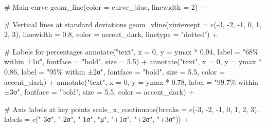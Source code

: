 \documentclass[
  letterpaper,
  DIV=11,
  numbers=noendperiod]{scrreprt}
\newenvironment{Shaded}{\begin{snugshade}}{\end{snugshade}}
\newcommand{\AttributeTok}[1]{\textcolor[rgb]{0.40,0.45,0.13}{#1}}
\newcommand{\CommentTok}[1]{\textcolor[rgb]{0.37,0.37,0.37}{#1}}
\newcommand{\DecValTok}[1]{\textcolor[rgb]{0.68,0.00,0.00}{#1}}
\newcommand{\FloatTok}[1]{\textcolor[rgb]{0.68,0.00,0.00}{#1}}
\newcommand{\FunctionTok}[1]{\textcolor[rgb]{0.28,0.35,0.67}{#1}}
\newcommand{\NormalTok}[1]{\textcolor[rgb]{0.00,0.23,0.31}{#1}}
\newcommand{\SpecialCharTok}[1]{\textcolor[rgb]{0.37,0.37,0.37}{#1}}
\newcommand{\StringTok}[1]{\textcolor[rgb]{0.13,0.47,0.30}{#1}}
\begin{document}
\begin{Shaded}
\begin{Highlighting}[]
  \CommentTok{\# Main curve}
  \FunctionTok{geom\_line}\NormalTok{(}\AttributeTok{color =}\NormalTok{ curve\_blue, }\AttributeTok{linewidth =} \DecValTok{2}\NormalTok{) }\SpecialCharTok{+}
  
  \CommentTok{\# Vertical lines at standard deviations}
  \FunctionTok{geom\_vline}\NormalTok{(}\AttributeTok{xintercept =} \FunctionTok{c}\NormalTok{(}\SpecialCharTok{{-}}\DecValTok{3}\NormalTok{, }\SpecialCharTok{{-}}\DecValTok{2}\NormalTok{, }\SpecialCharTok{{-}}\DecValTok{1}\NormalTok{, }\DecValTok{0}\NormalTok{, }\DecValTok{1}\NormalTok{, }\DecValTok{2}\NormalTok{, }\DecValTok{3}\NormalTok{), }
             \AttributeTok{linewidth =} \FloatTok{0.8}\NormalTok{, }\AttributeTok{color =}\NormalTok{ accent\_dark, }\AttributeTok{linetype =} \StringTok{"dotted"}\NormalTok{) }\SpecialCharTok{+}
  
  \CommentTok{\# Labels for percentages}
  \FunctionTok{annotate}\NormalTok{(}\StringTok{"text"}\NormalTok{, }\AttributeTok{x =} \DecValTok{0}\NormalTok{, }\AttributeTok{y =}\NormalTok{ ymax }\SpecialCharTok{*} \FloatTok{0.94}\NormalTok{, }
           \AttributeTok{label =} \StringTok{"68\% within ±1σ"}\NormalTok{, }
           \AttributeTok{fontface =} \StringTok{"bold"}\NormalTok{, }\AttributeTok{size =} \FloatTok{5.5}\NormalTok{) }\SpecialCharTok{+}
  \FunctionTok{annotate}\NormalTok{(}\StringTok{"text"}\NormalTok{, }\AttributeTok{x =} \DecValTok{0}\NormalTok{, }\AttributeTok{y =}\NormalTok{ ymax }\SpecialCharTok{*} \FloatTok{0.86}\NormalTok{, }
           \AttributeTok{label =} \StringTok{"95\% within ±2σ"}\NormalTok{, }
           \AttributeTok{fontface =} \StringTok{"bold"}\NormalTok{, }\AttributeTok{size =} \FloatTok{5.5}\NormalTok{, }\AttributeTok{color =}\NormalTok{ accent\_dark) }\SpecialCharTok{+}
  \FunctionTok{annotate}\NormalTok{(}\StringTok{"text"}\NormalTok{, }\AttributeTok{x =} \DecValTok{0}\NormalTok{, }\AttributeTok{y =}\NormalTok{ ymax }\SpecialCharTok{*} \FloatTok{0.78}\NormalTok{, }
           \AttributeTok{label =} \StringTok{"99.7\% within ±3σ"}\NormalTok{, }
           \AttributeTok{fontface =} \StringTok{"bold"}\NormalTok{, }\AttributeTok{size =} \FloatTok{5.5}\NormalTok{, }\AttributeTok{color =}\NormalTok{ accent\_dark) }\SpecialCharTok{+}
  
  \CommentTok{\# Axis labels at key points}
  \FunctionTok{scale\_x\_continuous}\NormalTok{(}\AttributeTok{breaks =} \FunctionTok{c}\NormalTok{(}\SpecialCharTok{{-}}\DecValTok{3}\NormalTok{, }\SpecialCharTok{{-}}\DecValTok{2}\NormalTok{, }\SpecialCharTok{{-}}\DecValTok{1}\NormalTok{, }\DecValTok{0}\NormalTok{, }\DecValTok{1}\NormalTok{, }\DecValTok{2}\NormalTok{, }\DecValTok{3}\NormalTok{),}
                     \AttributeTok{labels =} \FunctionTok{c}\NormalTok{(}\StringTok{"{-}3σ"}\NormalTok{, }\StringTok{"{-}2σ"}\NormalTok{, }\StringTok{"{-}1σ"}\NormalTok{, }\StringTok{"μ"}\NormalTok{, }\StringTok{"+1σ"}\NormalTok{, }\StringTok{"+2σ"}\NormalTok{, }\StringTok{"+3σ"}\NormalTok{)) }\SpecialCharTok{+}
  

\end{Highlighting}
\end{Shaded}
\end{document}
